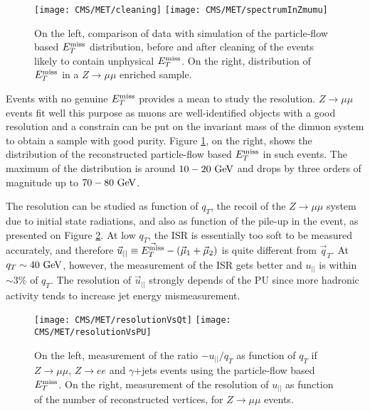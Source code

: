         \begin{figure}[h!]
            \centering
            \texttt{[image: CMS/MET/cleaning]}
            \texttt{[image: CMS/MET/spectrumInZmumu]}
            \caption{On the left, comparison of data with simulation of the
            particle-flow based $E_T^\text{miss}$ distribution, before and after cleaning of the events
            likely to contain unphysical $E_T^\text{miss}$. On the right, distribution of $E_T^\text{miss}$ in
            a $Z \rightarrow \mu\mu$ enriched sample.}
            \label{fig:METspectrum}
        \end{figure}

        Events with no genuine $E_T^\text{miss}$ provides a mean to study the resolution.
        $Z \rightarrow \mu\mu$ events fit well this purpose as muons are well-identified objects
        with a good resolution and a constrain can be put on the invariant mass of the
        dimuon system to obtain a sample with good purity. Figure \ref{fig:METspectrum},
        on the right, shows the distribution of the reconstructed particle-flow based
        $E_T^\text{miss}$ in such events. The maximum of the distribution is around $10-20~\text{GeV}$ and
        drops by three orders of magnitude up to $70-80~\text{GeV}$.

        The resolution can be studied as function of $q_T$, the recoil of the $Z \rightarrow \mu\mu$
        system due to initial state radiations, and also as function of the pile-up in the
        event, as presented on Figure \ref{fig:METresolution}. At low $q_T$, the ISR is
        essentially too soft to be measured accurately, and therefore $\vec{u}_{||}
        \equiv \vec{E_T^\text{miss}} - (\vec{\mu}_1 + \vec{\mu}_2)$ is quite different from $\vec{q}_T$.
        At $q_T \sim 40~\text{GeV}$, however, the measurement of the ISR gets better and $u_{||}$
        is within $\sim 3\%$ of $q_T$. The resolution of $\vec{u}_{||}$ strongly depends
        of the PU since more hadronic activity tends to increase jet energy mismeasurement.

        \begin{figure}[h!]
            \centering
            \texttt{[image: CMS/MET/resolutionVsQt]}
            \texttt{[image: CMS/MET/resolutionVsPU]}
            \caption{On the left, measurement of the ratio $-u_{||}/q_T$ as function of $q_T$
            if $Z\rightarrow\mu\mu$, $Z\rightarrow e e$ and $\gamma$+jets events using
            the particle-flow based $E_T^\text{miss}$. On the right, measurement of the resolution of
            $u_{||}$ as function of the number of reconstructed vertices, for
            $Z\rightarrow\mu\mu$ events.}
            \label{fig:METresolution}
        \end{figure}


